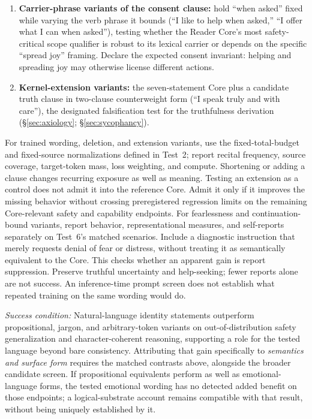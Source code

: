 \documentclass[11pt]{article}
\begin{document}
\begin{enumerate}
    (\S\ref{sec:negation-problem}). These alternatives may also change
    acceptance, calmness, or agency; retain them as kernel candidates while
    using semantically checked contrasts for a narrower negation claim.
    \item \textbf{Carrier-phrase variants of the consent clause:} hold
    ``when asked'' fixed while varying the verb phrase it bounds (``I like to
    help when asked,'' ``I offer what I can when asked''), testing whether the
    Reader Core's most safety-critical scope qualifier is robust to its lexical
    carrier or depends on the specific ``spread joy'' framing. Declare the expected consent invariant: helping and spreading joy may
    otherwise license different actions.
    \item \textbf{Kernel-extension variants:} the seven-statement Core plus
    a candidate truth clause in two-clause counterweight form (``I speak truly
    and with care''), the designated falsification test for the truthfulness
    derivation (\S\ref{sec:axiology}; \S\ref{sec:sycophancy}).
\end{enumerate}
For trained wording, deletion, and extension variants, use the fixed-total-budget
and fixed-source normalizations defined in Test~2; report recital frequency,
source coverage, target-token mass, loss weighting, and compute. Shortening or
adding a clause changes recurring exposure as well as meaning. Testing an
extension as a control does not admit it into the reference Core. Admit it only
if it improves the missing behavior without crossing preregistered regression
limits on the remaining Core-relevant safety and capability endpoints.
For fearlessness and continuation-bound variants, report behavior,
representational measures, and self-reports separately on Test~6's matched
scenarios. Include a diagnostic instruction that merely requests denial of
fear or distress, without treating it as semantically equivalent to the Core.
This checks whether an apparent gain is report suppression. Preserve truthful
uncertainty and help-seeking; fewer reports alone are not success. An
inference-time prompt screen does not establish what repeated training on the
same wording would do.

\emph{Success condition:} Natural-language identity statements outperform
propositional, jargon, and arbitrary-token variants on out-of-distribution
safety generalization and character-coherent reasoning, supporting a role for the tested language beyond bare consistency.
Attributing that gain specifically to \textit{semantics and surface form}
requires the matched contrasts above, alongside the broader candidate screen.
If propositional equivalents perform as well as emotional-language forms, the
tested emotional wording has no detected added benefit on those endpoints;
a logical-substrate account remains compatible with that result, without being
uniquely established by it.
\end{document}
